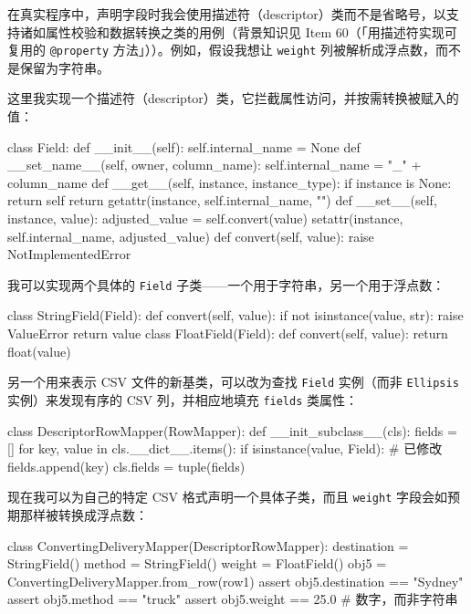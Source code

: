 在真实程序中，声明字段时我会使用描述符（descriptor）类而不是省略号，以支持诸如属性校验和数据转换之类的用例（背景知识见 Item 60（「用描述符实现可复用的 \texttt{@property} 方法」））。例如，假设我想让 \texttt{weight} 列被解析成浮点数，而不是保留为字符串。

这里我实现一个描述符（descriptor）类，它拦截属性访问，并按需转换被赋入的值：

\begin{codebox}[python]
class Field:
    def __init__(self):
        self.internal_name = None
    def __set_name__(self, owner, column_name):
        self.internal_name = "_" + column_name
    def __get__(self, instance, instance_type):
        if instance is None:
            return self
        return getattr(instance, self.internal_name, "")
    def __set__(self, instance, value):
        adjusted_value = self.convert(value)
        setattr(instance, self.internal_name, adjusted_value)
    def convert(self, value):
        raise NotImplementedError
\end{codebox}

我可以实现两个具体的 \texttt{Field} 子类——一个用于字符串，另一个用于浮点数：

\begin{codebox}[python]
class StringField(Field):
    def convert(self, value):
        if not isinstance(value, str):
            raise ValueError
        return value
class FloatField(Field):
    def convert(self, value):
        return float(value)
\end{codebox}

另一个用来表示 CSV 文件的新基类，可以改为查找 \texttt{Field} 实例（而非 \texttt{Ellipsis} 实例）来发现有序的 CSV 列，并相应地填充 \texttt{fields} 类属性：

\begin{codebox}[python]
class DescriptorRowMapper(RowMapper):
    def __init_subclass__(cls):
        fields = []
        for key, value in cls.__dict__.items():
            if isinstance(value, Field):  # 已修改
                fields.append(key)
        cls.fields = tuple(fields)
\end{codebox}

现在我可以为自己的特定 CSV 格式声明一个具体子类，而且 \texttt{weight} 字段会如预期那样被转换成浮点数：

\begin{codebox}[python]
class ConvertingDeliveryMapper(DescriptorRowMapper):
    destination = StringField()
    method = StringField()
    weight = FloatField()
obj5 = ConvertingDeliveryMapper.from_row(row1)
assert obj5.destination == "Sydney"
assert obj5.method == "truck"
assert obj5.weight == 25.0  # 数字，而非字符串
\end{codebox}

